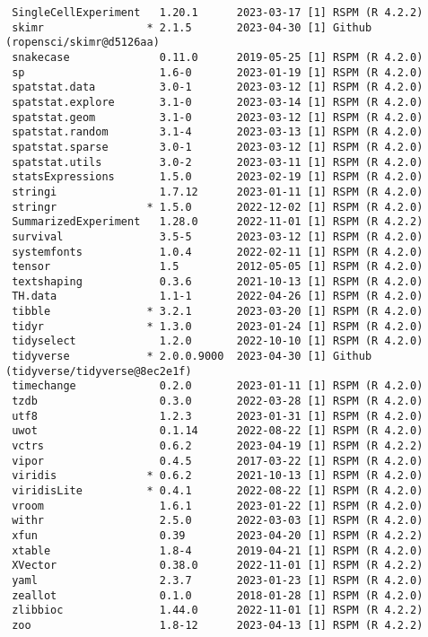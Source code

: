 \documentclass[
  letterpaper,
  DIV=11,
  numbers=noendperiod]{scrartcl}
\begin{document}
\begin{verbatim}
 SingleCellExperiment   1.20.1      2023-03-17 [1] RSPM (R 4.2.2)
 skimr                * 2.1.5       2023-04-30 [1] Github (ropensci/skimr@d5126aa)
 snakecase              0.11.0      2019-05-25 [1] RSPM (R 4.2.0)
 sp                     1.6-0       2023-01-19 [1] RSPM (R 4.2.0)
 spatstat.data          3.0-1       2023-03-12 [1] RSPM (R 4.2.0)
 spatstat.explore       3.1-0       2023-03-14 [1] RSPM (R 4.2.0)
 spatstat.geom          3.1-0       2023-03-12 [1] RSPM (R 4.2.0)
 spatstat.random        3.1-4       2023-03-13 [1] RSPM (R 4.2.0)
 spatstat.sparse        3.0-1       2023-03-12 [1] RSPM (R 4.2.0)
 spatstat.utils         3.0-2       2023-03-11 [1] RSPM (R 4.2.0)
 statsExpressions       1.5.0       2023-02-19 [1] RSPM (R 4.2.0)
 stringi                1.7.12      2023-01-11 [1] RSPM (R 4.2.0)
 stringr              * 1.5.0       2022-12-02 [1] RSPM (R 4.2.0)
 SummarizedExperiment   1.28.0      2022-11-01 [1] RSPM (R 4.2.2)
 survival               3.5-5       2023-03-12 [1] RSPM (R 4.2.0)
 systemfonts            1.0.4       2022-02-11 [1] RSPM (R 4.2.0)
 tensor                 1.5         2012-05-05 [1] RSPM (R 4.2.0)
 textshaping            0.3.6       2021-10-13 [1] RSPM (R 4.2.0)
 TH.data                1.1-1       2022-04-26 [1] RSPM (R 4.2.0)
 tibble               * 3.2.1       2023-03-20 [1] RSPM (R 4.2.0)
 tidyr                * 1.3.0       2023-01-24 [1] RSPM (R 4.2.0)
 tidyselect             1.2.0       2022-10-10 [1] RSPM (R 4.2.0)
 tidyverse            * 2.0.0.9000  2023-04-30 [1] Github (tidyverse/tidyverse@8ec2e1f)
 timechange             0.2.0       2023-01-11 [1] RSPM (R 4.2.0)
 tzdb                   0.3.0       2022-03-28 [1] RSPM (R 4.2.0)
 utf8                   1.2.3       2023-01-31 [1] RSPM (R 4.2.0)
 uwot                   0.1.14      2022-08-22 [1] RSPM (R 4.2.0)
 vctrs                  0.6.2       2023-04-19 [1] RSPM (R 4.2.2)
 vipor                  0.4.5       2017-03-22 [1] RSPM (R 4.2.0)
 viridis              * 0.6.2       2021-10-13 [1] RSPM (R 4.2.0)
 viridisLite          * 0.4.1       2022-08-22 [1] RSPM (R 4.2.0)
 vroom                  1.6.1       2023-01-22 [1] RSPM (R 4.2.0)
 withr                  2.5.0       2022-03-03 [1] RSPM (R 4.2.0)
 xfun                   0.39        2023-04-20 [1] RSPM (R 4.2.2)
 xtable                 1.8-4       2019-04-21 [1] RSPM (R 4.2.0)
 XVector                0.38.0      2022-11-01 [1] RSPM (R 4.2.2)
 yaml                   2.3.7       2023-01-23 [1] RSPM (R 4.2.0)
 zeallot                0.1.0       2018-01-28 [1] RSPM (R 4.2.0)
 zlibbioc               1.44.0      2022-11-01 [1] RSPM (R 4.2.2)
 zoo                    1.8-12      2023-04-13 [1] RSPM (R 4.2.2)


\end{verbatim}
\end{document}
